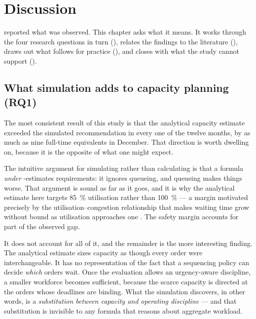 \chapter{Discussion}
\label{ch:discussion}

 reported what was observed. This chapter asks what it means. It works through
the four research questions in turn (), relates the findings to the literature
(), draws out what follows for practice
(), and closes with what the study cannot support
().

\section{What simulation adds to capacity planning (RQ1)}
\label{sec:disc-capacity}

The most consistent result of this study is that the analytical capacity estimate exceeded the
simulated recommendation in every one of the twelve months, by as much as nine full-time
equivalents in December. That direction is worth dwelling on, because it is the opposite of
what one might expect.

The intuitive argument for simulating rather than calculating is that a formula \emph{under}
-estimates requirements: it ignores queueing, and queueing makes things worse. That argument is
sound as far as it goes, and it is why the analytical estimate here targets \SI{85}{\percent}
utilisation rather than \SI{100}{\percent} --- a margin motivated precisely by the
utilisation--congestion relationship that makes waiting time grow without bound as utilisation
approaches one \citep{hopp2011}. The safety margin accounts for part of the observed gap.

It does not account for all of it, and the remainder is the more interesting finding. The
analytical estimate sizes capacity as though every order were interchangeable. It has no
representation of the fact that a sequencing policy can decide \emph{which} orders wait. Once
the evaluation allows an urgency-aware discipline, a smaller workforce becomes sufficient,
because the scarce capacity is directed at the orders whose deadlines are binding. What the
simulation discovers, in other words, is a \emph{substitution between capacity and operating
discipline} — and that substitution is invisible to any formula that reasons about aggregate
workload.

